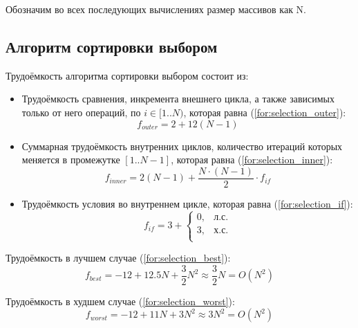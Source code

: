 Обозначим во всех последующих вычислениях размер массивов как N.

\subsection{Алгоритм сортировки выбором}

Трудоёмкость алгоритма сортировки выбором состоит из:
\begin{itemize}
    \item Трудоёмкость сравнения, инкремента внешнего цикла, а также зависимых только от него операций, по $i \in [1..N)$, которая равна (\ref{for:selection_outer}):
        \begin{equation}
            \label{for:selection_outer}
            f_{outer} = 2 + 12(N - 1)
        \end{equation}
    \item Суммарная трудоёмкость внутренних циклов, количество итераций которых меняется в промежутке $[1..N-1]$, которая равна (\ref{for:selection_inner}):
        \begin{equation}
            \label{for:selection_inner}
            f_{inner} = 2(N - 1) + \frac{N \cdot (N - 1)}{2} \cdot f_{if}
        \end{equation}
    \item Трудоёмкость условия во внутреннем цикле, которая равна (\ref{for:selection_if}):
        \begin{equation}
            \label{for:selection_if}
            f_{if} = 3 + \begin{cases}
                0, & \text{л.с.}\\
                3, & \text{х.с.}\\
            \end{cases}
        \end{equation}
\end{itemize}

Трудоёмкость в лучшем случае (\ref{for:selection_best}):
\begin{equation}
    \label{for:selection_best}
    f_{best} = -12 + 12.5N + \frac{3}{2}N^2 \approx \frac{3}{2}N = O(N^2)
\end{equation}

Трудоёмкость в худшем случае (\ref{for:selection_worst}):
\begin{equation}
    \label{for:selection_worst}
    f_{worst} = -12 + 11N + 3N^2 \approx 3N^2 = O(N^2)
\end{equation}



